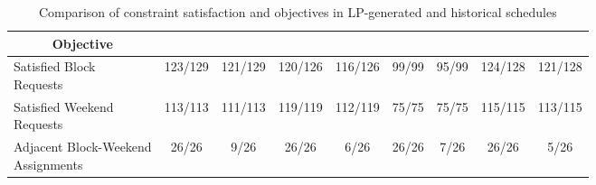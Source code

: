 \begin{table}[htbp]
\begin{adjustbox}{angle=90}
\begin{tabular}{l|cc|cc|cc|cc}
			\multicolumn{1}{c|}{\textbf{Objective}}             &            &                       &            &                       &            &                       &            &                      \\ \midrule
			\makecell[l]{Satisfied Block \\ Requests}           &  123/129   &        121/129        &  120/126   &        116/126        &   99/99    &         95/99         &  124/128   &       121/128        \\
			\makecell[l]{Satisfied Weekend \\ Requests}         &  113/113   &        111/113        &  119/119   &        112/119        &   75/75    &         75/75         &  115/115   &       113/115        \\
			\makecell[l]{Adjacent Block-Weekend \\ Assignments} &   26/26    &         9/26          &   26/26    &         6/26          &   26/26    &         7/26          &   26/26    &         5/26
		\end{tabular}%
	\end{adjustbox}
	\caption{Comparison of constraint satisfaction and objectives in LP-generated and historical schedules}
	\label{tbl:constraints-comparison}%
\end{table}%

